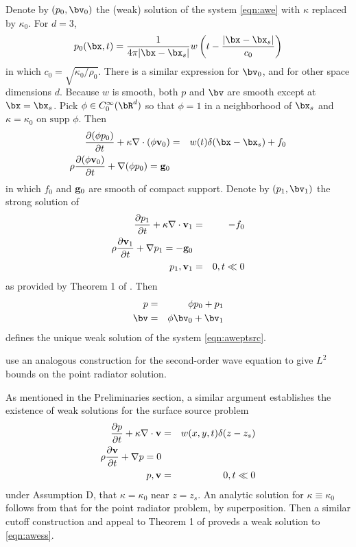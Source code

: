 Denote by $(p_0,\bv_0)$ the (weak) solution of the
system \ref{eqn:awe} with $\kappa$ replaced by $\kappa_0$. For $d=3$,
\[
 p_0(\bx,t) = \frac{1}{4\pi |\bx-\bx_s|}w\left(t-\frac{ |\bx-\bx_s|}{c_0}\right)
\]
in which $c_0=\sqrt{\kappa_0/\rho_0}$. There is a similar expression
for $\bv_0$, and for other space dimensions $d$. Because $w$ is smooth, both $p$ and $\bv$ are smooth
except at $\bx=\bx_s$. Pick $\phi \in C_0^{\infty}(\bR^d)$ so that
$\phi = 1$ in a neighborhood of $\bx_s$ and $\kappa=\kappa_0$ on
$\mbox{supp }\phi$. Then
\begin{eqnarray}
\label{eqn:awecut}
\frac{\partial (\phi p_0)}{\partial t} + \kappa \nabla \cdot (\phi {\bf v}_0) &=&
                           w(t)\delta(\bx-\bx_s) + f_0  \nonumber\\
\rho \frac{\partial (\phi {\bf v}_0)}{\partial t} + \nabla (\phi p_0) = {\bf g}_0 \nonumber\\
\end{eqnarray}
in which $f_0$ and ${\bf g}_0$ are smooth of compact support. Denote by
$(p_1,\bv_1)$ the strong solution of
\begin{eqnarray}
\label{eqn:awesupp}
\frac{\partial p_1}{\partial t} + \kappa \nabla \cdot {\bf v}_1 &=&
                                                                -f_0 \nonumber\\
\rho \frac{\partial {\bf v}_1}{\partial t} + \nabla p_1 = -{\bf g}_0 \nonumber\\
p_1,{\bf v}_1&=&0, t \ll 0
\end{eqnarray}
as provided by Theorem 1 of \cite{BlazekStolkSymes:13}. Then
\begin{eqnarray*}
  p & = & \phi p_0 + p_1\\
  \bv & = & \phi \bv_0 + \bv_1
\end{eqnarray*}
defines the unique weak solution of the system \ref{eqn:aweptsrc}.

\cite{SantosaSymes:00} use an analogous construction for the
second-order wave equation to give $L^2$ bounds on the point radiator
solution.

As mentioned in the Preliminaries section, a similar argument
establishes the existence of weak solutions for the surface source problem
\begin{eqnarray}
\label{eqn:awess}
\frac{\partial p}{\partial t} + \kappa \nabla \cdot {\bf v} &=&
                                                                w(x,y,t)\delta(z-z_s) \nonumber\\
\rho \frac{\partial {\bf v}}{\partial t} + \nabla p = 0 \nonumber\\
p,{\bf v}&=&0, t \ll 0
\end{eqnarray}
under Assumption D, that $\kappa=\kappa_0$ near $z=z_s$. An analytic
solution for $\kappa \equiv \kappa_0$ follows from that for the point
radiator problem, by superposition. Then a similar cutoff construction
and appeal to Theorem 1 of \cite{BlazekStolkSymes:13} proveds a weak
solution to \ref{eqn:awess}.

